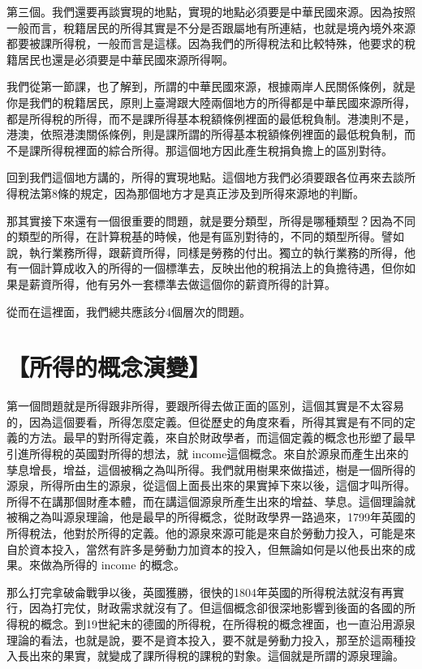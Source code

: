\documentclass[]{ctexbook}
\begin{document}
第三個。我們還要再談實現的地點，實現的地點必須要是中華民國來源。因為按照一般而言，稅籍居民的所得其實是不分是否跟屬地有所連結，也就是境內境外來源都要被課所得稅，一般而言是這樣。因為我們的所得稅法和比較特殊，他要求的稅籍居民也還是必須要是中華民國來源所得啊。

我們從第一節課，也了解到，所謂的中華民國來源，根據兩岸人民關係條例，就是你是我們的稅籍居民，原則上臺灣跟大陸兩個地方的所得都是中華民國來源所得，都是所得稅的所得，而不是課所得基本稅額條例裡面的最低稅負制。港澳則不是，港澳，依照港澳關係條例，則是課所謂的所得基本稅額條例裡面的最低稅負制，而不是課所得稅裡面的綜合所得。那這個地方因此產生稅捐負擔上的區別對待。

回到我們這個地方講的，所得的實現地點。這個地方我們必須要跟各位再來去談所得稅法第8條的規定，因為那個地方才是真正涉及到所得來源地的判斷。

那其實接下來還有一個很重要的問題，就是要分類型，所得是哪種類型？因為不同的類型的所得，在計算稅基的時候，他是有區別對待的，不同的類型所得。譬如說，執行業務所得，跟薪資所得，同樣是勞務的付出。獨立的執行業務的所得，他有一個計算成收入的所得的一個標準去，反映出他的稅捐法上的負擔待遇，但你如果是薪資所得，他有另外一套標準去做這個你的薪資所得的計算。

從而在這裡面，我們總共應該分4個層次的問題。

\hypertarget{ux6240ux5f97ux7684ux6982ux5ff5ux6f14ux8b8a}{%
\section{【所得的概念演變】}\label{ux6240ux5f97ux7684ux6982ux5ff5ux6f14ux8b8a}}

第一個問題就是所得跟非所得，要跟所得去做正面的區別，這個其實是不太容易的，因為這個要看，所得怎麼定義。但從歷史的角度來看，所得其實是有不同的定義的方法。最早的對所得定義，來自於財政學者，而這個定義的概念也形塑了最早引進所得稅的英國對所得的想法，就 income這個概念。來自於源泉而產生出來的孳息增長，增益，這個被稱之為叫所得。我們就用樹果來做描述，樹是一個所得的源泉，所得所由生的源泉，從這個上面長出來的果實掉下來以後，這個才叫所得。所得不在講那個財產本體，而在講這個源泉所產生出來的增益、孳息。這個理論就被稱之為叫源泉理論，他是最早的所得概念，從財政學界一路過來，1799年英國的所得稅法，他對於所得的定義。他的源泉來源可能是來自於勞動力投入，可能是來自於資本投入，當然有許多是勞動力加資本的投入，但無論如何是以他長出來的成果。來做為所得的 income 的概念。

那么打完拿破侖戰爭以後，英國獲勝，很快的1804年英國的所得稅法就沒有再實行，因為打完仗，財政需求就沒有了。但這個概念卻很深地影響到後面的各國的所得稅的概念。到19世紀末的德國的所得稅，在所得稅的概念裡面，也一直沿用源泉理論的看法，也就是說，要不是資本投入，要不就是勞動力投入，那至於這兩種投入長出來的果實，就變成了課所得稅的課稅的對象。這個就是所謂的源泉理論。
\end{document}
